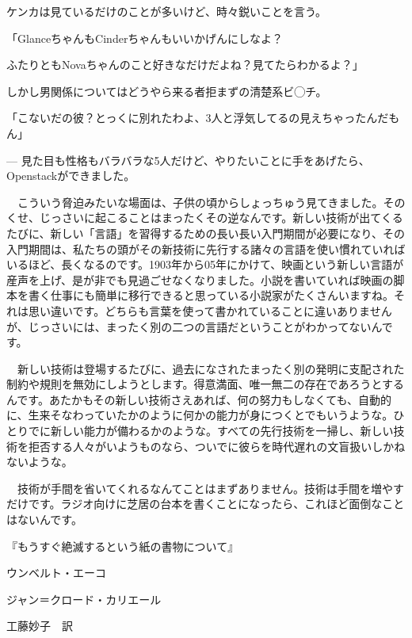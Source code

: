 \documentclass[8pt,b5paper,tombo,openany]{jsbook}
\begin{document}
ケンカは見ているだけのことが多いけど、時々鋭いことを言う。

「GlanceちゃんもCinderちゃんもいいかげんにしなよ？

ふたりともNovaちゃんのこと好きなだけだよね？見てたらわかるよ？」

しかし男関係についてはどうやら来る者拒まずの清楚系ビ◯チ。

「こないだの彼？とっくに別れたわよ、3人と浮気してるの見えちゃったんだもん」


--- 見た目も性格もバラバラな5人だけど、やりたいことに手をあげたら、Openstackができました。

\newpage

\thispagestyle{empty}

\begin{center}
\begin{minipage}{0.3\hsize}
\begin{tiny}
　こういう脅迫みたいな場面は、子供の頃からしょっちゅう見てきました。そのくせ、じっさいに起こることはまったくその逆なんです。新しい技術が出てくるたびに、新しい「言語」を習得するための長い長い入門期間が必要になり、その入門期間は、私たちの頭がその新技術に先行する諸々の言語を使い慣れていればいるほど、長くなるのです。1903年から05年にかけて、映画という新しい言語が産声を上げ、是が非でも見過ごせなくなりました。小説を書いていれば映画の脚本を書く仕事にも簡単に移行できると思っている小説家がたくさんいますね。それは思い違いです。どちらも言葉を使って書かれていることに違いありませんが、じっさいには、まったく別の二つの言語だということがわかってないんです。

　新しい技術は登場するたびに、過去になされたまったく別の発明に支配された制約や規則を無効にしようとします。得意満面、唯一無二の存在であろうとするんです。あたかもその新しい技術さえあれば、何の努力もしなくても、自動的に、生来そなわっていたかのように何かの能力が身につくとでもいうような。ひとりでに新しい能力が備わるかのような。すべての先行技術を一掃し、新しい技術を拒否する人々がいようものなら、ついでに彼らを時代遅れの文盲扱いしかねないような。

　技術が手間を省いてくれるなんてことはまずありません。技術は手間を増やすだけです。ラジオ向けに芝居の台本を書くことになったら、これほど面倒なことはないんです。
\begin{flushright}
『もうすぐ絶滅するという紙の書物について』

ウンベルト・エーコ

ジャン＝クロード・カリエール

工藤妙子　訳
\end{flushright}
\end{tiny}
\end{minipage}
\end{center}
\end{document}
